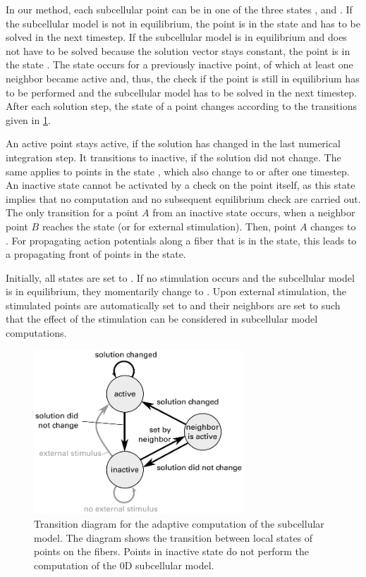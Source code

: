 In our method, each subcellular point can be in one of the three states ,  and .
If the subcellular model is not in equilibrium, the point is in the state  and has to be solved in the next timestep. If the subcellular model is in equilibrium and does not have to be solved because the solution vector stays constant, the point is in the state . The state  occurs for a previously inactive point, of which at least one neighbor became active and, thus, the check if the point is still in equilibrium has to be performed and the subcellular model has to be solved in the next timestep. After each solution step, the state of a point changes according to the transitions given in \cref{fig:state_chart}.

An active point stays active, if the solution has changed in the last numerical integration step. It transitions to inactive, if the solution did not change. The same applies to points in the state , which also change to  or  after one timestep. 
An inactive state cannot be activated by a check on the point itself, as this state implies that no computation and no subsequent equilibrium check are carried out. The only transition for a point $A$ from an inactive state occurs, when a neighbor point $B$ reaches the state  (or for external stimulation). Then, point $A$ changes to .
For propagating action potentials along a fiber that is in the  state, this leads to a propagating front of points in the  state.

Initially, all states are set to . If no stimulation occurs and the subcellular model is in equilibrium, they momentarily change to . Upon external stimulation, the stimulated points are automatically set to  and their neighbors are set to  such that the effect of the stimulation can be considered in subcellular model computations.

\begin{figure}
  \centering
  \includegraphics[width=0.7\textwidth]{images/implementation/state_chart.pdf}%
  \caption{Transition diagram for the adaptive computation of the subcellular model. The diagram shows the transition between local states of points on the fibers. Points in inactive state do not perform the computation of the 0D subcellular model.}
  \label{fig:state_chart}
\end{figure}

